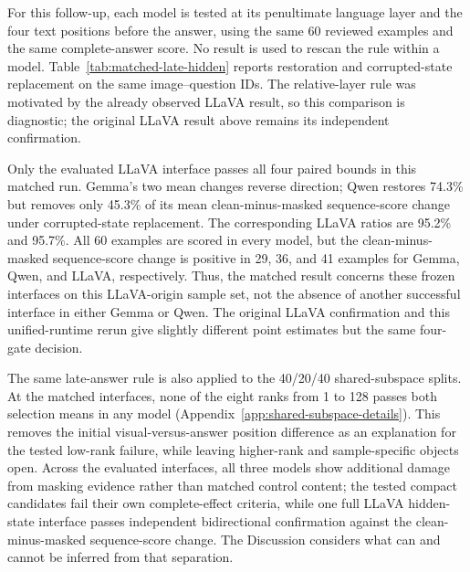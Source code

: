 For this follow-up, each model is tested at its penultimate language layer and the four text positions before the answer, using the same 60 reviewed examples and the same complete-answer score. No result is used to rescan the rule within a model. Table~\ref{tab:matched-late-hidden} reports restoration and corrupted-state replacement on the same image--question IDs. The relative-layer rule was motivated by the already observed LLaVA result, so this comparison is diagnostic; the original LLaVA result above remains its independent confirmation.



Only the evaluated LLaVA interface passes all four paired bounds in this matched run. Gemma's two mean changes reverse direction; Qwen restores 74.3\% but removes only 45.3\% of its mean clean-minus-masked sequence-score change under corrupted-state replacement. The corresponding LLaVA ratios are 95.2\% and 95.7\%. All 60 examples are scored in every model, but the clean-minus-masked sequence-score change is positive in 29, 36, and 41 examples for Gemma, Qwen, and LLaVA, respectively. Thus, the matched result concerns these frozen interfaces on this LLaVA-origin sample set, not the absence of another successful interface in either Gemma or Qwen. The original LLaVA confirmation and this unified-runtime rerun give slightly different point estimates but the same four-gate decision.

The same late-answer rule is also applied to the 40/20/40 shared-subspace splits. At the matched interfaces, none of the eight ranks from 1 to 128 passes both selection means in any model (Appendix~\ref{app:shared-subspace-details}). This removes the initial visual-versus-answer position difference as an explanation for the tested low-rank failure, while leaving higher-rank and sample-specific objects open. Across the evaluated interfaces, all three models show additional damage from masking evidence rather than matched control content; the tested compact candidates fail their own complete-effect criteria, while one full LLaVA hidden-state interface passes independent bidirectional confirmation against the clean-minus-masked sequence-score change. The Discussion considers what can and cannot be inferred from that separation.

\FloatBarrier
